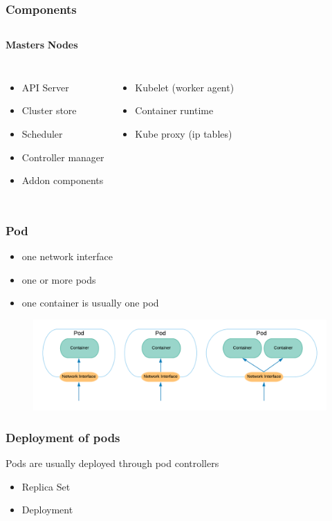 \documentclass{beamer}
\begin{document}
\begin{frame}
    \frametitle{Components}
    \begin{columns}
    \textbf{Masters}
    \textbf{Nodes}
    \end{columns}
    \begin{columns}
    \begin{itemize}
        \item API Server
        \item Cluster store
        \item Scheduler
        \item Controller manager
        \item Addon components
    \end{itemize}
    \begin{itemize}
        \item Kubelet (worker agent)
        \item Container runtime
        \item Kube proxy (ip tables)
    \end{itemize}
    \end{columns}
\end{frame}


\begin{frame}
\frametitle{Pod}
    \begin{itemize}
        \item one network interface
        \item one or more pods
        \item one container is usually one pod
    \end{itemize}
    \begin{figure}
        \includegraphics[width=\linewidth]{images/Pods.png}
    \end{figure}
\end{frame}

\begin{frame}
\frametitle{Deployment of pods}
Pods are usually deployed through pod controllers
\begin{itemize}
    \item Replica Set
    \item Deployment
\end{itemize}
\end{frame}
\end{document}

